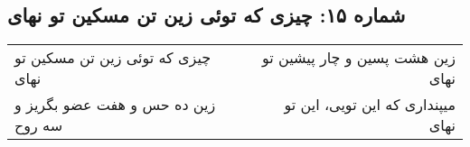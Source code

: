 \begin{center}
\section*{شماره ۱۵: چیزی که توئی زین تن مسکین تو نهای}
\label{sec:015}
\begin{longtable}{l p{0.5cm} r}
چیزی که توئی زین تن مسکین تو نهای
&&
زین هشت پسین و چار پیشین تو نهای
\\
زین ده حس و هفت عضو بگریز و سه روح
&&
میپنداری که این تویی، این تو نهای
\\
\end{longtable}
\end{center}
